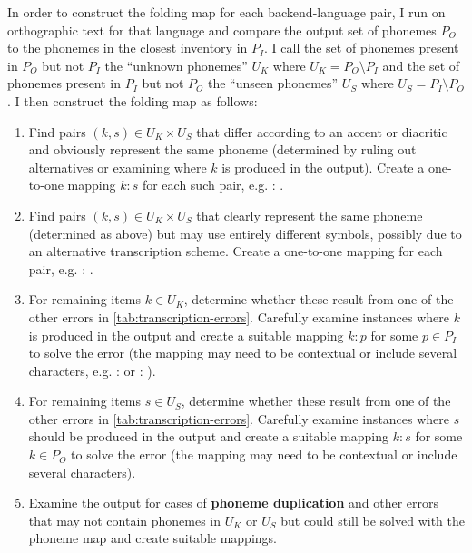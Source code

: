 In order to construct the folding map for each backend-language pair, I run \corpusphonemizer on orthographic text for that language and compare the output set of phonemes $P_O$ to the phonemes in the closest inventory in \phoible $P_I$. I call the set of phonemes present in $P_O$ but not $P_I$ the ``unknown phonemes'' $U_K$ where $U_K = P_O \setminus P_I $ and the set of phonemes present in $P_I$ but not $P_O$ the ``unseen phonemes'' $U_S$ where $U_S = P_I \setminus P_O $. I then construct the folding map as follows:
\begin{enumerate}
    \item Find pairs $(k,s) \in U_K \times U_S$ that differ according to an accent or diacritic and obviously represent the same phoneme (determined by ruling out alternatives or examining where $k$ is produced in the output). Create a one-to-one mapping $k:s$ for each such pair, e.g.  : .
    \item Find pairs $(k,s) \in U_K \times U_S$ that clearly represent the same phoneme (determined as above) but may use entirely different symbols, possibly due to an alternative transcription scheme. Create a one-to-one mapping for each pair, e.g.  : \ttipa{\ae}.
    \item For remaining items $k \in U_K$, determine whether these result from one of the other errors in \cref{tab:transcription-errors}. Carefully examine instances where $k$ is produced in the output and create a suitable mapping $k : p$ for some $p \in P_I$ to solve the error (the mapping may need to be contextual or include several characters, e.g. \ttipa{\textrhookschwa} :  or  : ). 
    \item For remaining items $s \in U_S$, determine whether these result from one of the other errors in \cref{tab:transcription-errors}. Carefully examine instances where $s$ should be produced in the output and create a suitable mapping $k : s$ for some $k \in P_O$ to solve the error (the mapping may need to be contextual or include several characters). 
    \item Examine the output for cases of \textbf{phoneme duplication} and other errors that may not contain phonemes in $U_K$ or $U_S$ but could still be solved with the phoneme map and create suitable mappings.
\end{enumerate}

